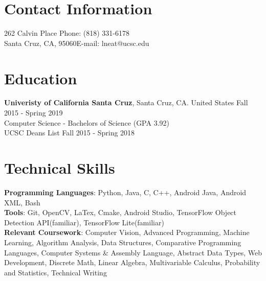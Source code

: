 \documentclass[mm,line]{res}
\begin{document}
 \hfill 

\begin{resume}
\section{\sc Contact Information}

\vspace{.05in}
  262 Calvin Place \hfill         {Phone:}  (818) 331-6178 \\
  Santa Cruz, CA, 95060\hfill {E-mail:}  lneat@ucsc.edu\\
 

\section{\sc Education}
{\bf Univeristy of California Santa Cruz}, Santa Cruz, CA. United States \hfill Fall 2015 - Spring 2019\\
Computer Science - Bachelors of Science \hfill(GPA 3.92)\\
UCSC Deans List \hfill Fall 2015 - Spring 2018 

\section{\sc Technical Skills}
{\bf Programming Languages}: Python, Java, C, C++, Android Java, Android XML, Bash \vspace{2mm} \\ 
{\bf Tools}: Git, OpenCV, LaTex, Cmake, Android Studio, TensorFlow Object Detection API(familiar), TensorFlow Lite(familiar) \vspace{2mm}   \\
{\bf Relevant Coursework}: Computer Vision, Advanced Programming, Machine Learning, Algorithm Analysis, Data Structures, Comparative Programming Languages, Computer Systems \& Assembly Language, Abstract Data Types, Web Development, Discrete Math, Linear Algebra,  Multivariable Calculus, Probability and Statistics, Technical Writing \\

\end{resume}
\end{document}
